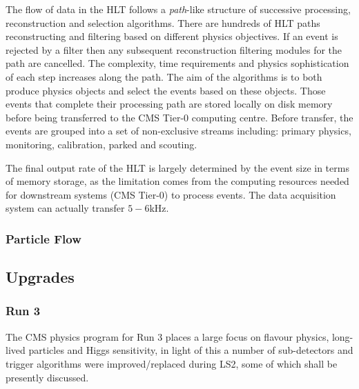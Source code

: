 The flow of data in the HLT follows a \textit{path}-like structure of successive processing, reconstruction and selection algorithms. There are hundreds of HLT paths reconstructing and filtering based on different physics objectives. If an event is rejected by a filter then any subsequent reconstruction filtering modules for the path are cancelled.
The complexity, time requirements and physics sophistication of each step increases along the path. The aim of the algorithms is to both produce physics objects and select the events based on these objects. 
Those events that complete their processing path are stored locally on disk memory before being transferred to the CMS Tier-0 computing centre. Before transfer, the events are grouped into a set of non-exclusive streams including: primary physics, monitoring, calibration, parked and scouting\cite{thomas2019cms}.
\vspace{12pt}


The final output rate of the HLT is largely determined by the event size in terms of memory storage, as the limitation comes from the computing resources needed for downstream systems (CMS Tier-0) to process events. The data acquisition system can actually transfer $5-6$kHz. 


\subsubsection{Particle Flow}





\subsection{Upgrades}



\subsubsection{Run 3}

The CMS physics program for Run 3 places a large focus on flavour physics, long-lived particles and Higgs sensitivity\cite{fontanesi2022cms,dordevic2022cms}, in light of this a number of sub-detectors and trigger algorithms were improved/replaced during LS2\cite{morovic2023cms}, some of which shall be presently discussed.
\vspace{12pt}

